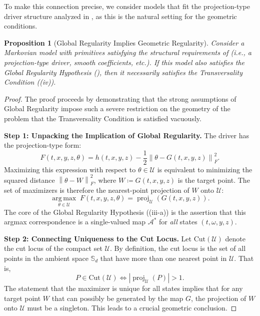 \documentclass[12pt, letterpaper]{amsart}
\newcommand{\Thetacal}{\mathcal{A}}
\newcommand{\Ucal}{\mathcal{U}}
\newcommand{\Sd}{\mathbb{S}_d}
\newcommand{\norm}[1]{\left\lVert#1\right\rVert}
\newcommand{\abs}[1]{\left\lvert#1\right\rvert}
\DeclareMathOperator*{\argmax}{arg\,max}
\DeclareMathOperator*{\proj}{proj}
\theoremstyle{plain}
\newtheorem{proposition}[theorem]{Proposition}
\theoremstyle{definition}
\theoremstyle{remark}
\numberwithin{equation}{section} %
\begin{document}
To make this connection precise, we consider models that fit the projection-type driver structure analyzed in , as this is the natural setting for the geometric conditions.

\begin{proposition}[Global Regularity Implies Geometric Regularity]
\label{prop:gr_implies_geor}
Consider a Markovian model with primitives satisfying the structural requirements of  (i.e., a projection-type driver, smooth coefficients, etc.). If this model also satisfies the Global Regularity Hypothesis (), then it necessarily satisfies the Transversality Condition ((iv)).
\end{proposition}

\begin{proof}
The proof proceeds by demonstrating that the strong assumptions of Global Regularity impose such a severe restriction on the geometry of the problem that the Transversality Condition is satisfied vacuously.

\vspace{1ex}
\noindent\textbf{Step 1: Unpacking the Implication of Global Regularity.}
The driver has the projection-type form:
\[ F(t,x,y,z,\theta) = h(t,x,y,z) - \frac{1}{2}\norm{\theta - G(t,x,y,z)}_F^2. \]
Maximizing this expression with respect to \(\theta \in \Ucal\) is equivalent to minimizing the squared distance \(\norm{\theta - W}_F^2\), where \(W \coloneqq G(t,x,y,z)\) is the target point. The set of maximizers is therefore the nearest-point projection of \(W\) onto \(\Ucal\):
\[ \underset{\theta \in \Ucal}{\argmax} \; F(t,x,y,z,\theta) = \proj_{\Ucal}(G(t,x,y,z)). \]
The core of the Global Regularity Hypothesis ((iii-a)) is the assertion that this argmax correspondence is a single-valued map \(\Thetacal^*\) for \emph{all} states \((t,\omega,y,z)\).

\vspace{1ex}
\noindent\textbf{Step 2: Connecting Uniqueness to the Cut Locus.}
Let \(\mathrm{Cut}(\Ucal)\) denote the cut locus of the compact set \(\Ucal\). By definition, the cut locus is the set of all points in the ambient space \(\Sd\) that have more than one nearest point in \(\Ucal\). That is,
\[ P \in \mathrm{Cut}(\Ucal) \iff \abs{\proj_{\Ucal}(P)} > 1. \]
The statement that the maximizer is unique for all states implies that for any target point \(W\) that can possibly be generated by the map \(G\), the projection of \(W\) onto \(\Ucal\) must be a singleton. This leads to a crucial geometric conclusion.


\end{proof}
\end{document}
